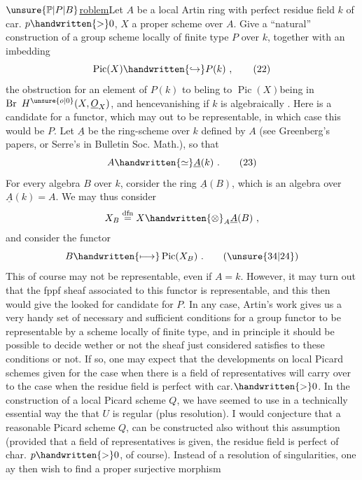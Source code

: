 \uline{$\unsure{\mathbb{P}|P|B}$roblem}\quad Let $A$ be a local Artin ring with perfect residue field $k$ of car. $p\handwritten{>}0$, $X$ a proper scheme over $A$. Give a ``natural'' construction of a group scheme locally of finite type $P$ over $k$, together with an imbedding
\[
\operatorname{Pic}(X)\handwritten{\hookrightarrow}P(k)\ ,
\tag*{(22)}
\]
the obstruction for an element of $P(k)$ to beling to $\operatorname{Pic}(X)$\handwritten{(}being in $\operatorname{Br}\ H^{\unsure{o|0}}(X,\underline{O}_X)$, and hence\handwritten{)}vanishing if $k$ is algebraically .
Here is a candidate for a functor, which may  out to be representable, in which case this would be $P$. Let $\underline{A}$ be the ring-scheme over $k$ defined by $A$ (see Greenberg's papers, or Serre's in Bulletin Soc. Math.), so that
\[
A\handwritten{\simeq}\underline{A}(k)\ .
\tag*{(23)}
\]
For every algebra $B$ over $k$, corsider the ring $\underline{A}(B)$, which is an algebra over $\underline{A}(k)=A$. We may thus consider
\[
X_B\overset{\mathrm{dfn}}{=}X\handwritten{\otimes}_A\underline{A}(B)\ ,
\]
and consider the functor
\[
B\handwritten{\longmapsto}\operatorname{Pic}(X_B)\ .
\tag*{(\unsure{34|24})}
\]
This of course may not be representable, even if $A=k$. However, it may turn out that the fppf sheaf associated to this functor is representable, and this then would give the looked for candidate for $P$. In any case, Artin's work gives us a very handy set of necessary and sufficient conditions for a group functor to be representable by a scheme locally of finite type, and in principle it should be possible to decide wether or not the  sheaf just considered satisfies to these conditions or not. If so, one may expect that the developments on local Picard schemes given for the case when there is a field of representatives will carry over to the case when the residue field is perfect with car.$\handwritten{>}0$.
In the construction of a local Picard scheme $Q$, we have seemed to use in a technically essential way the   that $U$ is regular (plus resolution). I would conjecture that a reasonable  Picard scheme $Q$,  can be constructed also without this assumption (provided that a field of representatives is given,  the residue field is perfect of char. $p\handwritten{>}0$, of course). Instead of a resolution of singularities, one ay then wish to find a proper surjective morphism
